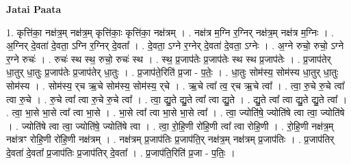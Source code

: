 \documentclass[17pt]{extarticle}
\begin{document}
\textbf{Jatai Paata} \newline

1. कृत्ति॑का॒ नक्ष॑त्र॒म् नक्ष॑त्र॒म् कृत्ति॑काः॒ कृत्ति॑का॒ नक्ष॑त्रम् । . नक्ष॑त्र म॒ग्नि र॒ग्निर् नक्ष॑त्र॒म् नक्ष॑त्र म॒ग्निः । . अ॒ग्निर् दे॒वता॑ दे॒वता॒ ऽग्नि र॒ग्निर् दे॒वता᳚ । . दे॒वता॒ ऽग्ने र॒ग्नेर् दे॒वता॑ दे॒वता॒ ऽग्नेः । . अ॒ग्ने रुचो॒ रुचो॒ ऽग्ने र॒ग्ने रुचः॑ । . रुचः॑ स्थ स्थ॒ रुचो॒ रुचः॑ स्थ । . स्थ॒ प्र॒जाप॑तेः प्र॒जाप॑तेः स्थ स्थ प्र॒जाप॑तेः । . प्र॒जाप॑तेर् धा॒तुर् धा॒तुः प्र॒जाप॑तेः प्र॒जाप॑तेर् धा॒तुः । . प्र॒जाप॑ते॒रिति॑ प्र॒जा - प॒तेः॒ । . धा॒तुः सोम॑स्य॒ सोम॑स्य धा॒तुर् धा॒तुः सोम॑स्य । . सोम॑स्य॒ र्‌च ऋ॒चे सोम॑स्य॒ सोम॑स्य॒ र्‌चे । . ऋ॒चे त्वा᳚ त्व॒ र्‌च ऋ॒चे त्वा᳚ । . त्वा॒ रु॒चे रु॒चे त्वा᳚ त्वा रु॒चे । . रु॒चे त्वा᳚ त्वा रु॒चे रु॒चे त्वा᳚ । . त्वा॒ द्यु॒ते द्यु॒ते त्वा᳚ त्वा द्यु॒ते । . द्यु॒ते त्वा᳚ त्वा द्यु॒ते द्यु॒ते त्वा᳚ । . त्वा॒ भा॒से भा॒से त्वा᳚ त्वा भा॒से । . भा॒से त्वा᳚ त्वा भा॒से भा॒से त्वा᳚ । . त्वा॒ ज्योति॑षे॒ ज्योति॑षे त्वा त्वा॒ ज्योति॑षे । . ज्योति॑षे त्वा त्वा॒ ज्योति॑षे॒ ज्योति॑षे त्वा । . त्वा॒ रो॒हि॒णी रो॑हि॒णी त्वा᳚ त्वा रोहि॒णी । . रो॒हि॒णी नक्ष॑त्र॒म् नक्ष॑त्रꣳ रोहि॒णी रो॑हि॒णी नक्ष॑त्रम् । . नक्ष॑त्रम् प्र॒जाप॑तिः प्र॒जाप॑ति॒र् नक्ष॑त्र॒म् नक्ष॑त्रम् प्र॒जाप॑तिः । . प्र॒जाप॑तिर् दे॒वता॑ दे॒वता᳚ प्र॒जाप॑तिः प्र॒जाप॑तिर् दे॒वता᳚ । . प्र॒जाप॑ति॒रिति॑ प्र॒जा - प॒तिः॒ । \newline
\end{document}
